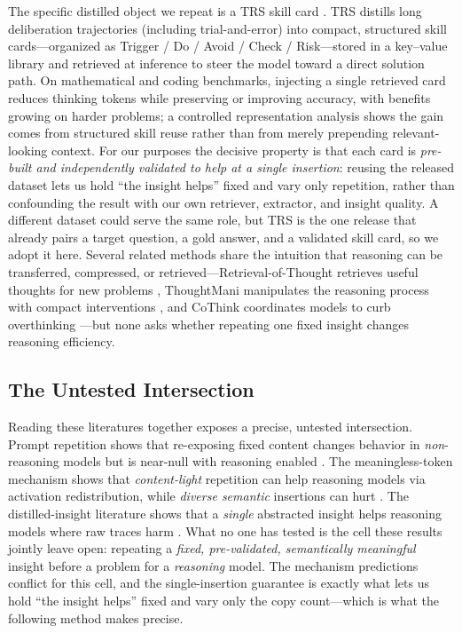 The specific distilled object we repeat is a TRS skill card \citep{zhao2026trs}. TRS
distills long deliberation trajectories (including trial-and-error) into compact,
structured skill cards---organized as Trigger / Do / Avoid / Check / Risk---stored
in a key--value library and retrieved at inference to steer the model toward a direct
solution path. On mathematical and coding benchmarks, injecting a single retrieved
card reduces thinking tokens while preserving or improving accuracy, with benefits
growing on harder problems; a controlled representation analysis shows the gain comes
from structured skill reuse rather than from merely prepending relevant-looking
context. For our purposes the decisive property is that each card is \emph{pre-built
and independently validated to help at a single insertion}: reusing the released
dataset lets us hold ``the insight helps'' fixed and vary only repetition, rather
than confounding the result with our own retriever, extractor, and insight quality.
A different dataset could serve the same role, but TRS is the one release that
already pairs a target question, a gold answer, and a validated skill card, so we
adopt it here. Several related methods share the intuition that reasoning can be
transferred, compressed, or retrieved---Retrieval-of-Thought retrieves useful
thoughts for new problems \citep{ahmed2026retrieval}, ThoughtMani manipulates the
reasoning process with compact interventions \citep{liu2025thoughtmani}, and CoThink
coordinates models to curb overthinking \citep{fan2025cothink}---but none asks
whether repeating one fixed insight changes reasoning efficiency.

\subsection{The Untested Intersection}
\label{subsec:rw-positioning}

Reading these literatures together exposes a precise, untested intersection. Prompt
repetition shows that re-exposing fixed content changes behavior in
\emph{non}-reasoning models but is near-null with reasoning enabled
\citep{leviathan2025prompt}. The meaningless-token mechanism shows that
\emph{content-light} repetition can help reasoning models via activation
redistribution, while \emph{diverse semantic} insertions can hurt
\citep{shi2025meaningless}. The distilled-insight literature shows that a
\emph{single} abstracted insight helps reasoning models where raw traces harm
\citep{wang2025harm, didolkar2025metacognitive, zhao2026trs}. What no one has tested
is the cell these results jointly leave open: repeating a \emph{fixed,
pre-validated, semantically meaningful} insight before a problem for a
\emph{reasoning} model. The mechanism predictions conflict for this cell, and the
single-insertion guarantee is exactly what lets us hold ``the insight helps'' fixed
and vary only the copy count---which is what the following method makes precise.
